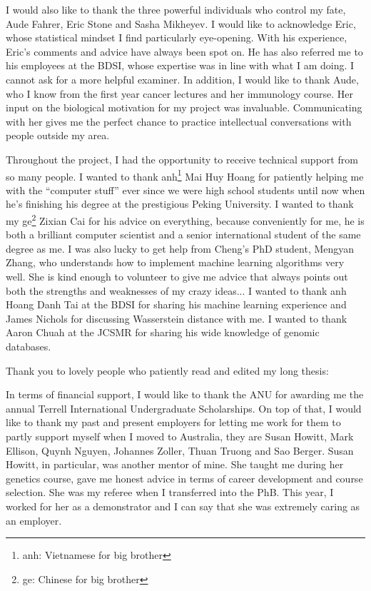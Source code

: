I would also like to thank the three powerful individuals who control my fate, Aude Fahrer, Eric Stone and Sasha Mikheyev. I would like to acknowledge Eric, whose statistical mindset I find particularly eye-opening. With his experience, Eric's comments and advice have always been spot on. He has also referred me to his employees at the BDSI, whose expertise was in line with what I am doing. I cannot ask for a more helpful examiner. In addition, I would like to thank Aude, who I know from the first year cancer lectures and her immunology course. Her input on the biological motivation for my project was invaluable. Communicating with her gives me the perfect chance to practice intellectual conversations with people outside my area.

Throughout the project, I had the opportunity to receive technical support from so many people. I wanted to thank anh\footnote{anh: Vietnamese for big brother} Mai Huy Hoang for patiently helping me with the ``computer stuff'' ever since we were high school students until now when he's finishing his degree at the prestigious Peking University. I wanted to thank my ge\footnote{ge: Chinese for big brother} Zixian Cai for his advice on everything, because conveniently for me, he is both a brilliant computer scientist and a senior international student of the same degree as me. I was also lucky to get help from Cheng's PhD student, Mengyan Zhang, who understands how to implement machine learning algorithms very well. She is kind enough to volunteer to give me advice that always points out both the strengths and weaknesses of my crazy ideas... I wanted to thank anh Hoang Danh Tai at the BDSI for sharing his machine learning experience and James Nichols for discussing Wasserstein distance with me. I wanted to thank Aaron Chuah at the JCSMR for sharing his wide knowledge of genomic databases. 

Thank you to lovely people who patiently read and edited my long thesis: 

In terms of financial support, I would like to thank the ANU for awarding me the annual Terrell International Undergraduate Scholarships. On top of that, I would like to thank my past and present employers for letting me work for them to partly support myself when I moved to Australia, they are Susan Howitt, Mark Ellison, Quynh Nguyen, Johannes Zoller, Thuan Truong and Sao Berger. Susan Howitt, in particular, was another mentor of mine. She taught me during her genetics course, gave me honest advice in terms of career development and course selection. She was my referee when I transferred into the PhB. This year, I worked for her as a demonstrator and I can say that she was extremely caring as an employer. 

